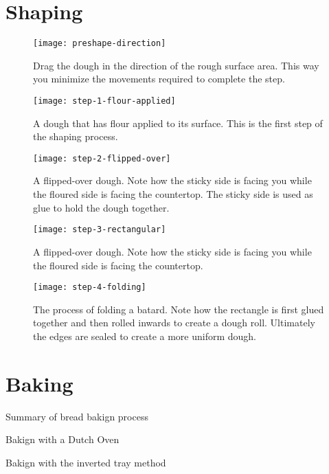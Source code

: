 \documentclass[paper=a4, twoside=false, fontsize=12pt]{scrbook}
\begin{document}
\clearpage{}

\section*{Shaping}
\begin{flowchart}[!htb]

\end{flowchart}

\begin{figure}[!htb]
  \texttt{[image: preshape-direction]}
  \caption[Dragging direction]{Drag the dough in the direction of the rough
      surface area. This way you minimize the movements required to complete
      the step.}%
  \label{fig:preshape-direction}
\end{figure}
\begin{figure}[!htb]
  \texttt{[image: step-1-flour-applied]}
  \caption[Step 1 of shaping process]{A dough that has flour applied to its
      surface. This is the first step of the shaping process.}%
  \label{fig:shaping-flour-surface}
\end{figure}
\begin{figure}[!htb]
  \texttt{[image: step-2-flipped-over]}
  \caption[Step 2 of shaping process]{A flipped-over dough. Note how the
      sticky side is facing you while the floured side is facing the
      countertop.  The sticky side is used as glue to hold the dough together.}
\end{figure}
\begin{figure}[htb!]
  \texttt{[image: step-3-rectangular]}
  \caption[Step 3 of shaping process]{A flipped-over dough. Note how the
      sticky side is facing you while the floured side is facing the
      countertop.}%
  \label{fig:shaping-rectangular-dough}
\end{figure}
\begin{figure}[htb!]
  \texttt{[image: step-4-folding]}
  \caption[Step 4 of shaping process]{The process of folding a batard. Note
      how the rectangle is first glued together and then rolled inwards to
      create a dough roll. Ultimately the edges are sealed to create a more
      uniform dough.}%
  \label{fig:shaping-folding}
\end{figure}
\clearpage{}

\section*{Baking}
\begin{flowchart}[!htb]

\caption*{Summary of bread bakign process}
\end{flowchart}

\begin{flowchart*}[!htb]

\caption*{Bakign with a Dutch Oven}
\end{flowchart*}

\begin{flowchart}[!htb]

\caption*{Bakign with the inverted tray method}
\end{flowchart}
\clearpage{}
\end{document}
